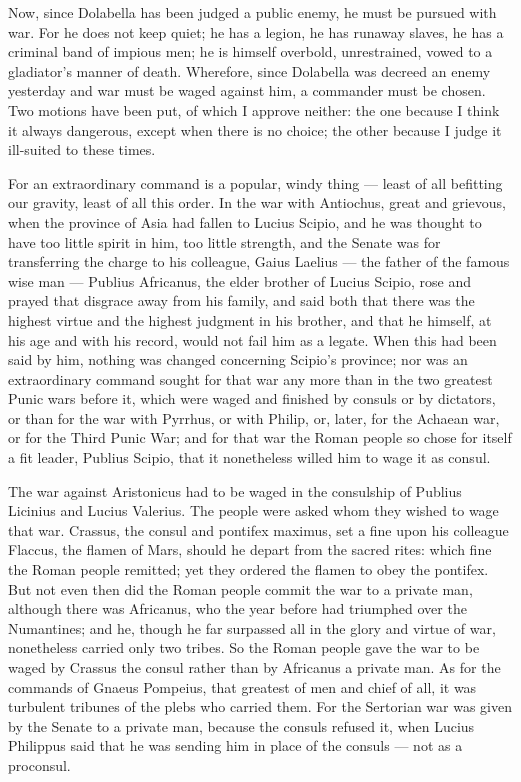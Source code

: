  Now, since Dolabella has been judged a public enemy, he must be pursued with war. For he does not keep quiet; he has a legion, he has runaway slaves, he has a criminal band of impious men; he is himself overbold, unrestrained, vowed to a gladiator's manner of death. Wherefore, since Dolabella was decreed an enemy yesterday and war must be waged against him, a commander must be chosen. Two motions have been put, of which I approve neither: the one because I think it always dangerous, except when there is no choice; the other because I judge it ill-suited to these times.

 For an extraordinary command is a popular, windy thing --- least of all befitting our gravity, least of all this order. In the war with Antiochus, great and grievous, when the province of Asia had fallen to Lucius Scipio, and he was thought to have too little spirit in him, too little strength, and the Senate was for transferring the charge to his colleague, Gaius Laelius --- the father of the famous wise man --- Publius Africanus, the elder brother of Lucius Scipio, rose and prayed that disgrace away from his family, and said both that there was the highest virtue and the highest judgment in his brother, and that he himself, at his age and with his record, would not fail him as a legate. When this had been said by him, nothing was changed concerning Scipio's province; nor was an extraordinary command sought for that war any more than in the two greatest Punic wars before it, which were waged and finished by consuls or by dictators, or than for the war with Pyrrhus, or with Philip, or, later, for the Achaean war, or for the Third Punic War; and for that war the Roman people so chose for itself a fit leader, Publius Scipio, that it nonetheless willed him to wage it as consul.

 The war against Aristonicus had to be waged in the consulship of Publius Licinius and Lucius Valerius. The people were asked whom they wished to wage that war. Crassus, the consul and pontifex maximus, set a fine upon his colleague Flaccus, the flamen of Mars, should he depart from the sacred rites: which fine the Roman people remitted; yet they ordered the flamen to obey the pontifex. But not even then did the Roman people commit the war to a private man, although there was Africanus, who the year before had triumphed over the Numantines; and he, though he far surpassed all in the glory and virtue of war, nonetheless carried only two tribes. So the Roman people gave the war to be waged by Crassus the consul rather than by Africanus a private man. As for the commands of Gnaeus Pompeius, that greatest of men and chief of all, it was turbulent tribunes of the plebs who carried them. For the Sertorian war was given by the Senate to a private man, because the consuls refused it, when Lucius Philippus said that he was sending him in place of the consuls --- not as a proconsul.

